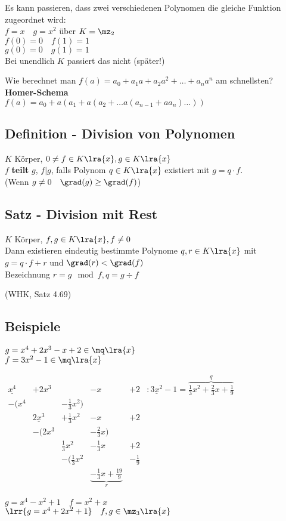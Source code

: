 			Es kann passieren, dass zwei verschiedenen Polynomen die gleiche Funktion zugeordnet wird:\\
			$f=x\quad g=x^2$ über $K=\mz_2$\\
			$f(0)=0\quad f(1)=1$\\
			$g(0)=0\quad g(1)=1$\\
			Bei unendlich $K$ passiert das nicht (später!)
		\item Wie berechnet man $f(a)=a_0+a_1a+a_2a^2+\dots +a_na^n$ am schnellsten?\\
			\textbf{Homer-Schema}\\
			$f(a) = a_0+a(a_1+a(a_2+\dots a(a_{n-1}+aa_n)\dots))$
	\subExEnd
\subsection{Definition - Division von Polynomen}
	$K$ Körper, $0\neq f\in K\lra{x}, g\in K\lra{x}$\\
	$f$ \textbf{teilt} $g$, $f|g$, falls Polynom $q\in K\lra{x}$ existiert mit $g=q\cdot f$.\\
	(Wenn $g\neq 0\quad \grad(g)\geq\grad(f)$)
\subsection{Satz - Division mit Rest}
	$K$ Körper, $f,g\in K\lra{x}, f\neq 0$\\
	Dann existieren eindeutig bestimmte Polynome $q,r\in K\lra{x}$ mit\\
	$g=q\cdot f+r$ und $\grad(r) <\grad(f)$\\
	Bezeichnung $r=g\mod f, q=g\div f$
	\begin{flushright}
		(WHK, Satz 4.69)
	\end{flushright}
\subsection{Beispiele}
		\item $g=x^4+2x^3-x+2\in\mq\lra{x}$\\
			$f=3x^2-1\in\mq\lra{x}$

			$\begin{array}{rrrrrl}
				\underline{x^4}	&+2x^3				&						&-x				&+2			&: \underline{3x^2}-1=\overbrace{\frac{1}{3}x^2+\frac{2}{3}x+\frac{1}{9}}^{q}\\
				-(x^4			&					&-\frac{1}{3}x^2)		&				&&\\
								&\underline{2x^3}	&+\frac{1}{3}x^2			&-x			&+2&\\
								&-(2x^3				&						&-\frac{2}{3}x)	&&\\
								&					&\frac{1}{3}x^2			&-\frac{1}{3}x	&+2	&\\
								&					&-(\frac{1}{3}x^2		&				&-\frac{1}{9}	&\\
								&					&						&\underbrace{-\frac{1}{3}x+\frac{19}{9}}_r&
			\end{array}$	
		\item $g=x^4-x^2+1\quad f=x^2+x$\\
			$\lrr{g=x^4+2x^2+1}\quad f,g\in \mz_3\lra{x}$

